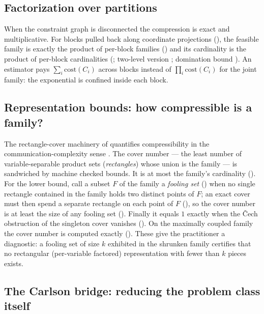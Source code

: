 \documentclass[11pt]{article}
\begin{document}
\subsection{Factorization over partitions}

When the constraint graph is disconnected the compression is exact and
multiplicative.  For blocks pulled back along coordinate projections
(), the feasible family is exactly the product of
per-block families () and its
cardinality is the product of per-block cardinalities
(; two-level version
; domination bound
).  An estimator pays
$\sum_i \mathrm{cost}(C_i)$ across blocks instead of
$\prod_i \mathrm{cost}(C_i)$ for the joint family: the exponential is
confined inside each block.

\subsection{Representation bounds: how compressible is a family?}

The rectangle-cover machinery of 
quantifies compressibility in the communication-complexity sense
\citep{kushilevitz1997communication}.  The cover number
 --- the least number of variable-separable
product sets (\emph{rectangles}) whose union is the family --- is
sandwiched by machine checked bounds.  It is at most the family's
cardinality ().  For the lower bound,
call a subset $F$ of the family a \emph{fooling set}
() when no single rectangle contained in the family
holds two distinct points of $F$; an exact cover must then spend a
separate rectangle on each point of $F$
(), so the cover number is
at least the size of any fooling set
().  Finally it equals $1$
exactly when the \v{C}ech obstruction of the singleton cover vanishes
().  On the maximally
coupled family the cover number is computed exactly
().  These give the practitioner a
diagnostic: a fooling set of size $k$ exhibited in the shrunken family
certifies that no rectangular (per-variable factored) representation
with fewer than $k$ pieces exists.

\subsection{The Carlson bridge: reducing the problem class itself}
\end{document}
